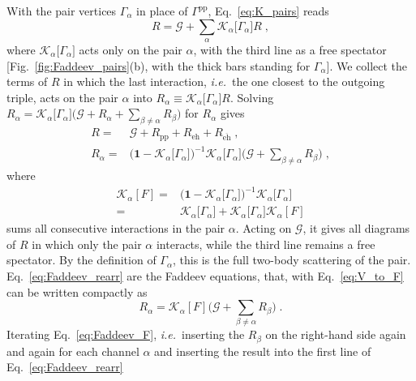 \documentclass[aip,jcp,reprint,noshowkeys,superscriptaddress]{revtex4-1}
\newcommand{\ie}{\textit{i.e.}}
\newcommand{\bI}{\boldsymbol{1}}
\newcommand{\cK}{\mathcal{K}}
\newcommand{\eh}{\text{eh}}
\newcommand{\teh}{\overline{\text{eh}}}
\newcommand{\pp}{\text{pp}}
\begin{document}
With the pair vertices $\Gamma_\alpha$ in place of $\Gamma^{\pp}$,
Eq.~\eqref{eq:K_pairs} reads
\begin{equation}
R=\mathcal G+\sum_{\alpha}\cK_\alpha\big[\Gamma_\alpha\big] R \;,
\label{eq:Dyson_pairs}
\end{equation}
where $\cK_\alpha\big[\Gamma_\alpha\big]$ acts only on the pair $\alpha$, with the
third line as a free spectator [Fig.~\ref{fig:Faddeev_pairs}(b), with
the thick bars standing for $\Gamma_\alpha$].
We collect the terms of $R$ in which the last interaction, \ie\ the
one closest to the outgoing triple, acts on the pair $\alpha$ into
$R_\alpha\equiv\cK_\alpha\big[\Gamma_\alpha\big] R$. Solving
$R_\alpha=\cK_\alpha\big[\Gamma_\alpha\big]\big(\mathcal G+R_\alpha+\sum_{\beta\neq\alpha}R_\beta\big)$
for $R_\alpha$ gives
\begin{equation}
\label{eq:Faddeev_rearr}
\begin{aligned}
R
= &
\mathcal G+R_{\pp}+R_{\eh}+R_{\teh} \;,
\\
R_\alpha
= &
\big(\bI-\cK_\alpha\big[\Gamma_\alpha\big]\big)^{-1}\cK_\alpha\big[\Gamma_\alpha\big]
\Big(\mathcal G+\sum_{\beta\neq\alpha}R_\beta\Big) \;,
\end{aligned}
\end{equation}
where 
\begin{equation}
	\label{eq:V_to_F}
	\begin{aligned}
\cK_\alpha[F] = &
\big(\bI-\cK_\alpha\big[\Gamma_\alpha\big]\big)^{-1}\cK_\alpha\big[\Gamma_\alpha\big]
\\ 
= & 
\cK_\alpha\big[\Gamma_\alpha\big]+\cK_\alpha\big[\Gamma_\alpha\big]\cK_\alpha[F]
	\end{aligned}
\end{equation}
sums all consecutive interactions in the pair $\alpha$. Acting on $\mathcal G$,
it gives all
diagrams of $R$ in which only the pair $\alpha$ interacts, while the
third line remains a free spectator. By the definition of $\Gamma_\alpha$,
this is the full two-body scattering of the pair.
Eq.~\eqref{eq:Faddeev_rearr} are the Faddeev
equations,\cite{Barbieri2001,Degroote2011}
that, with Eq.~\eqref{eq:V_to_F} can be written compactly as
\begin{equation}
\label{eq:Faddeev_F}
R_\alpha
=
\cK_\alpha[F]\Big(\mathcal G+\sum_{\beta\neq\alpha}R_\beta\Big) \;.
\end{equation}
Iterating Eq.~\eqref{eq:Faddeev_F}, \ie\ inserting the $R_\beta$ on
the right-hand side again and again for each channel $\alpha$ and 
inserting the result into the first line of Eq.~\eqref{eq:Faddeev_rearr}
\end{document}
